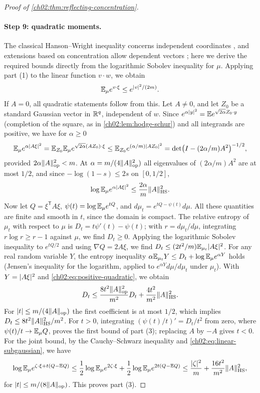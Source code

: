 \begin{proof}[Proof of \cref{ch02:thm:reflecting-concentration}]
\paragraph{Step 9: quadratic moments.} The classical Hanson--Wright inequality concerns independent coordinates \cite{HansonWright1971}, and extensions based on concentration allow dependent vectors \cite[Theorem~2.5, p.~4]{Adamczak2015}; here we derive the required bounds directly from the logarithmic Sobolev inequality for $\mu$. Applying part (1) to the linear function $v\cdot w$, we obtain
\begin{equation}\label{ch02:eq:linear-subgaussian}
 \mathbb E_\mu e^{v\cdot\xi}\le e^{\lvert v\rvert^2/(2m)}.
\end{equation}
If $A=0$, all quadratic statements follow from this. Let $A\ne0$, and let $Z_0$ be a standard Gaussian vector in $\mathbb R^q$, independent of $w$. Since $e^{\alpha\lvert y\rvert^2}=\mathbb E e^{\sqrt{2\alpha}Z_0\cdot y}$ (completion of the square, as in \cref{ch02:lem:hodge-schur}) and all integrands are positive, we have for $\alpha\ge0$
\[
 \mathbb E_\mu e^{\alpha\lvert A\xi\rvert^2}=\mathbb E_{Z_0}\mathbb E_\mu e^{\sqrt{2\alpha}(AZ_0)\cdot\xi}\le\mathbb E_{Z_0}e^{(\alpha/m)\lvert AZ_0\rvert^2}=\det\bigl(I-(2\alpha/m)A^2\bigr)^{-1/2},
\]
provided $2\alpha\lVert A\rVert_{\mathrm{op}}^2<m$. At $\alpha=m/(4\lVert A\rVert_{\mathrm{op}}^2)$ all eigenvalues of $(2\alpha/m)A^2$ are at most $1/2$, and since $-\log(1-s)\le2s$ on $[0,1/2]$,
\begin{equation}\label{ch02:eq:positive-quadratic}
 \log\mathbb E_\mu e^{\alpha\lvert A\xi\rvert^2}\le\frac{2\alpha}m\lVert A\rVert_{\mathrm{HS}}^2.
\end{equation}
Now let $Q=\xi^{\mathsf T}A\xi$, $\psi(t)=\log\mathbb E_\mu e^{tQ}$, and $d\mu_t=e^{tQ-\psi(t)}d\mu$. All these quantities are finite and smooth in $t$, since the domain is compact. The relative entropy of $\mu_t$ with respect to $\mu$ is $D_t=t\psi'(t)-\psi(t)$; with $r=d\mu_t/d\mu$, integrating $r\log r\ge r-1$ against $\mu$, we find $D_t\ge0$. Applying the logarithmic Sobolev inequality to $e^{tQ/2}$ and using $\nabla Q=2A\xi$, we find $D_t\le(2t^2/m)\mathbb E_{\mu_t}\lvert A\xi\rvert^2$. For any real random variable $Y$, the entropy inequality $\alpha\mathbb E_{\mu_t}Y\le D_t+\log\mathbb E_\mu e^{\alpha Y}$ holds (Jensen's inequality for the logarithm, applied to $e^{\alpha Y}d\mu/d\mu_t$ under $\mu_t$). With $Y=\lvert A\xi\rvert^2$ and \eqref{ch02:eq:positive-quadratic}, we obtain
\[
 D_t\le\frac{8t^2\lVert A\rVert_{\mathrm{op}}^2}{m^2}D_t+\frac{4t^2}{m^2}\lVert A\rVert_{\mathrm{HS}}^2.
\]
For $\lvert t\rvert\le m/(4\lVert A\rVert_{\mathrm{op}})$ the first coefficient is at most $1/2$, which implies $D_t\le8t^2\lVert A\rVert_{\mathrm{HS}}^2/m^2$. For $t>0$, integrating $(\psi(t)/t)'=D_t/t^2$ from zero, where $\psi(t)/t\to\mathbb E_\mu Q$, proves the first bound of part (3); replacing $A$ by $-A$ gives $t<0$. For the joint bound, by the Cauchy--Schwarz inequality and \eqref{ch02:eq:linear-subgaussian}, we have
\[
 \log\mathbb E_\mu e^{\zeta\cdot\xi+t(Q-\mathbb E Q)}\le\frac12\log\mathbb E_\mu e^{2\zeta\cdot\xi}+\frac12\log\mathbb E_\mu e^{2t(Q-\mathbb E Q)}\le\frac{\lvert \zeta\rvert^2}m+\frac{16t^2}{m^2}\lVert A\rVert_{\mathrm{HS}}^2,
\]
for $\lvert t\rvert\le m/(8\lVert A\rVert_{\mathrm{op}})$. This proves part (3).


\end{proof}
